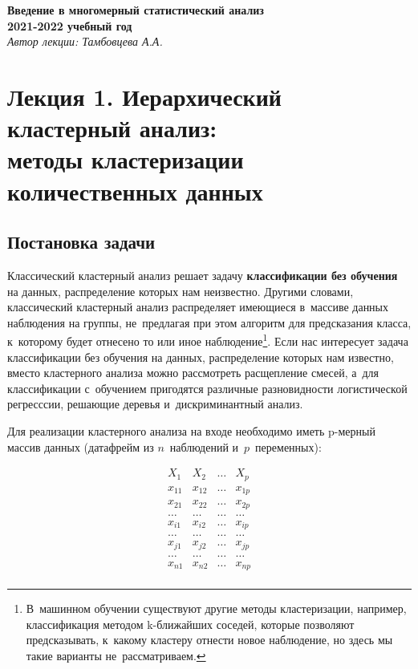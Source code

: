\documentclass[12pt,a4paper]{article}
\theoremstyle{definition}
\begin{document}
\textbf{Введение в многомерный статистический анализ\\
2021-2022 учебный год}\medskip\\
\textit{Автор лекции: Тамбовцева А.А.}

\section*{Лекция 1. Иерархический кластерный анализ: \\
методы кластеризации количественных данных}
\setcounter{section}{1}
\subsection{Постановка задачи}

Классический кластерный анализ решает задачу \textbf{классификации без обучения} 
на данных, распределение которых нам неизвестно. Другими словами, классический 
кластерный анализ распределяет имеющиеся в~массиве данных наблюдения на группы, 
не~предлагая при этом алгоритм для предсказания класса, к~которому будет отнесено 
то или иное наблюдение\footnote{В~машинном обучении существуют другие методы 
кластеризации, например, классификация методом k-ближайших соседей, которые позволяют 
предсказывать, к~какому кластеру отнести новое наблюдение, но здесь мы такие варианты 
не~рассматриваем.}.
Если нас интересует задача классификации без обучения на данных, распределение которых 
нам известно, вместо кластерного анализа можно рассмотреть расщепление смесей, а~для 
классификации с~обучением пригодятся различные разновидности логистической 
регресссии, решающие деревья и~дискриминантный анализ.

Для реализации кластерного анализа на входе необходимо иметь $\text{p}$-мерный 
массив данных (датафрейм из $n$~наблюдений и~$p$~переменных):

$$
\begin{matrix}
X_1 & X_2 & \dots & X_p \\
x_{11} & x_{12} & \dots & x_{1p} \\
x_{21} & x_{22} & \dots & x_{2p} \\
\dots & \dots & \dots & \dots \\
x_{i1} & x_{i2} & \dots & x_{ip} \\
\dots & \dots & \dots & \dots \\
x_{j1} & x_{j2} & \dots & x_{jp} \\
\dots & \dots & \dots & \dots \\
x_{n1} & x_{n2} & \dots & x_{np} \\
\end{matrix}
$$
\end{document}
